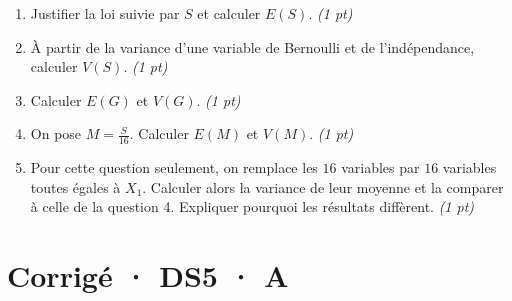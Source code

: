 \begin{enumerate}

\item Justifier la loi suivie par $S$ et calculer $E(S)$. \hfill\textit{(1 pt)}

\item À partir de la variance d'une variable de Bernoulli et de l'indépendance, calculer $V(S)$. \hfill\textit{(1 pt)}

\item Calculer $E(G)$ et $V(G)$. \hfill\textit{(1 pt)}

\item On pose $M=\frac S{16}$. Calculer $E(M)$ et $V(M)$. \hfill\textit{(1 pt)}

\item Pour cette question seulement, on remplace les $16$ variables par $16$ variables toutes égales à $X_1$. Calculer alors la variance de leur moyenne et la comparer à celle de la question 4. Expliquer pourquoi les résultats diffèrent. \hfill\textit{(1 pt)}

\end{enumerate}

\ifprof\clearpage

\section*{Corrigé · DS5 · A}\label{cor:7-3}

